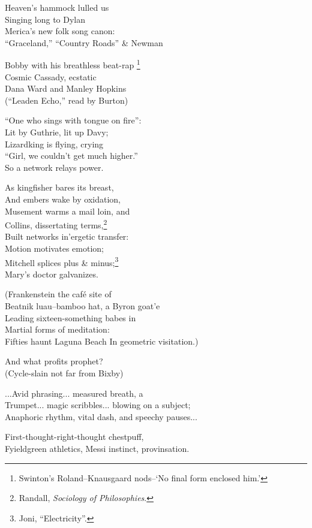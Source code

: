 Heaven's hammock lulled us \\
Singing long to Dylan \\
Merica's new folk song canon: \\
``Graceland,'' ``Country Roads'' \& Newman

Bobby with his breathless beat-rap
\footnote{Swinton's Roland--Knausgaard nods--`No final form enclosed him.'} \\
Cosmic Cassady, ecstatic \\
Dana Ward and Manley Hopkins \\
(``Leaden Echo,'' read by Burton)

``One who sings with tongue on fire'': \\
Lit by Guthrie, lit up Davy;  \\
Lizardking is flying, crying \\
``Girl, we couldn't get much higher.'' \\
So a network relays power.

As kingfisher bares its breast, \\
And embers wake by oxidation, \\
Musement warms a mail loin, and \\
Collins, dissertating terms,\footnote{Randall, \textit{Sociology of Philosophies}.} \\
Built networks in'ergetic transfer: \\
Motion motivates emotion; \\
Mitchell splices plus \& minus;\footnote{Joni, ``Electricity''.} \\
Mary's doctor galvanizes.

(Frankenstein the café site of \\
Beatnik luau--bamboo hat, a Byron goat'e \\
Leading sixteen-something babes in \\
Martial forms of meditation: \\
Fifties haunt Laguna Beach
In geometric visitation.)

And what profits prophet? \\
(Cycle-slain not far from Bixby)

...Avid phrasing... measured breath, a \\
Trumpet... magic scribbles... blowing on a subject; \\
Anaphoric rhythm, vital dash, and speechy pauses...

First-thought-right-thought chestpuff, \\
Fyieldgreen athletics, Messi instinct, provinsation.
